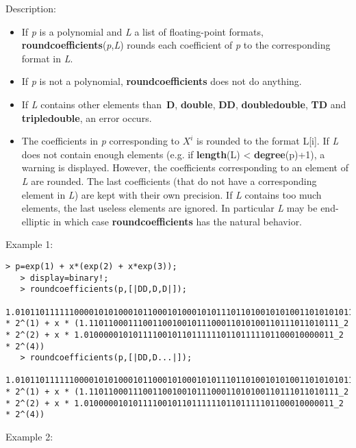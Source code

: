 \noindent Description: \begin{itemize}

\item If \emph{p} is a polynomial and \emph{L} a list of floating-point formats, 
   \textbf{roundcoefficients}(\emph{p},\emph{L}) rounds each coefficient of \emph{p} to the corresponding format
   in \emph{L}.

\item If \emph{p} is not a polynomial, \textbf{roundcoefficients} does not do anything.

\item If \emph{L} contains other elements than \textbf{D}, \textbf{double}, \textbf{DD}, \textbf{doubledouble}, \textbf{TD} and
   \textbf{tripledouble}, an error occurs.

\item The coefficients in \emph{p} corresponding to $X^i$ is rounded to the 
   format L[i]. If \emph{L} does not contain enough elements
   (e.g. if \textbf{length}(L) < \textbf{degree}(p)+1), a warning is displayed. However, the
   coefficients corresponding to an element of \emph{L} are rounded. The last 
   coefficients (that do not have a corresponding element in \emph{L}) are kept with
   their own precision.
   If \emph{L} contains too much elements, the last useless elements are ignored.
   In particular \emph{L} may be end-elliptic in which case \textbf{roundcoefficients} has the 
   natural behavior.
\end{itemize}
\noindent Example 1: 
\begin{center}\begin{minipage}{14.8cm}\begin{Verbatim}[frame=single]
   > p=exp(1) + x*(exp(2) + x*exp(3));
   > display=binary!;
   > roundcoefficients(p,[|DD,D,D|]);
   1.010110111111000010101000101100010100010101110110100101010011010101011111101110001010110001000000010011101_2 * 2^(1) + x * (1.110110001110011001001011100011010100110111011010111_2 * 2^(2) + x * 1.010000010101111001011011111101101111101100010000011_2 * 2^(4))
   > roundcoefficients(p,[|DD,D...|]);
   1.010110111111000010101000101100010100010101110110100101010011010101011111101110001010110001000000010011101_2 * 2^(1) + x * (1.110110001110011001001011100011010100110111011010111_2 * 2^(2) + x * 1.010000010101111001011011111101101111101100010000011_2 * 2^(4))
\end{Verbatim}
\end{minipage}\end{center}
\noindent Example 2: 
